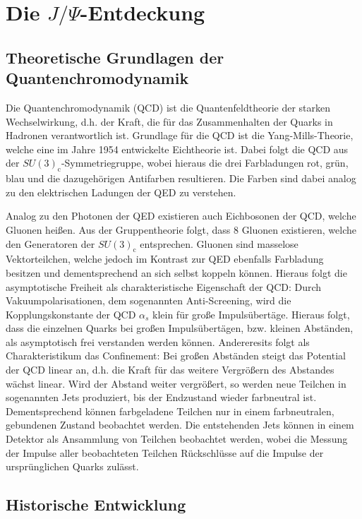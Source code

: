 
\section[Die J/Psi-Entdeckung]{Die $J/\Psi$-Entdeckung}


\subsection{Theoretische Grundlagen der Quantenchromodynamik}
Die Quantenchromodynamik (QCD) ist die Quantenfeldtheorie der starken Wechselwirkung, d.h. der Kraft, die für das Zusammenhalten der Quarks in Hadronen verantwortlich ist.
Grundlage für die QCD ist die Yang-Mills-Theorie, welche eine im Jahre 1954 entwickelte Eichtheorie ist.
Dabei folgt die QCD aus der $SU(3)_\text{c}$-Symmetriegruppe, wobei hieraus die drei Farbladungen rot, grün, blau und die dazugehörigen Antifarben resultieren.
Die Farben sind dabei analog zu den elektrischen Ladungen der QED zu verstehen.

Analog zu den Photonen der QED existieren auch Eichbosonen der QCD, welche Gluonen heißen.
Aus der Gruppentheorie folgt, dass 8 Gluonen existieren, welche den Generatoren der $SU(3)_\text{c}$ entsprechen.
Gluonen sind masselose Vektorteilchen, welche jedoch im Kontrast zur QED ebenfalls Farbladung besitzen und dementsprechend an sich selbst koppeln können.
Hieraus folgt die asymptotische Freiheit als charakteristische Eigenschaft der QCD:
Durch Vakuumpolarisationen, dem sogenannten Anti-Screening, wird die Kopplungskonstante der QCD $\alpha_{s}$ klein für große Impulsübertäge. 
Hieraus folgt, dass die einzelnen Quarks bei großen Impulsübertägen, bzw. kleinen Abständen, als asymptotisch frei verstanden werden können.
Andereresits folgt als Charakteristikum das Confinement: Bei großen Abständen steigt das Potential der QCD linear an, d.h. die Kraft für das weitere Vergrößern des Abstandes wächst linear.
Wird der Abstand weiter vergrößert, so werden neue Teilchen in sogenannten Jets produziert, bis der Endzustand wieder farbneutral ist.
Dementsprechend können farbgeladene Teilchen nur in einem farbneutralen, gebundenen Zustand beobachtet werden.
Die entstehenden Jets können in einem Detektor als Ansammlung von Teilchen beobachtet werden, wobei die Messung der Impulse aller beobachteten Teilchen Rückschlüsse auf die Impulse der ursprünglichen Quarks zulässt.

\subsection{Historische Entwicklung}

